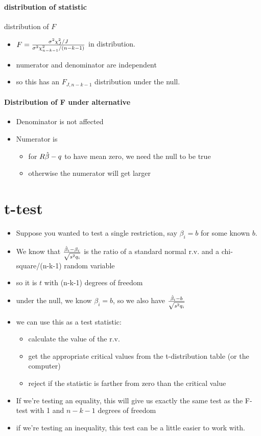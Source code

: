 \paragraph{distribution of statistic}
       distribution of $F$
\begin{itemize}
\item $F = {\sigma^2 \chi^2_J / J \over \sigma^2 \chi^2_{n-k-1} / (n-k-1)}$ in
  distribution.
\item numerator and denominator are independent
\item so this has an $F_{J, n-k-1}$ distribution under the null.
\end{itemize}

\paragraph{Distribution of F under alternative}
\begin{itemize}
\item Denominator is not affected
\item Numerator is
\begin{itemize}
\item for $R\hat{\beta} - q$ to have mean zero, we need the null to
          be true
\item otherwise the numerator will get larger
\end{itemize}
\end{itemize}

\section{t-test}

\begin{itemize}[leftmargin=0pt]

\item Suppose you wanted to test a single restriction, say $\beta_i = b$
  for some known $b$.
\item We know that ${\hat{\beta}_i - \beta_i \over \sqrt{s^2 q_i}}$ is the ratio of
  a standard normal r.v. and a chi-square/(n-k-1) random variable
\item so it is $t$ with (n-k-1) degrees of freedom
\item under the null, we know $\beta_i = b$, so we also have ${\hat{\beta}_i - b
    \over \sqrt{s^2 q_i}}$
\item we can use this as a test statistic:
  \begin{itemize}
  \item calculate the value of the r.v.
  \item get the appropriate critical values from the t-distribution
    table (or the computer)
  \item reject if the statistic is farther from zero than the critical
    value
  \end{itemize}
\item If we're testing an equality, this will give us exactly the same
  test as the F-test with 1 and $n-k-1$ degrees of freedom
\item if we're testing an inequality, this test can be a little easier
  to work with.
\end{itemize}

